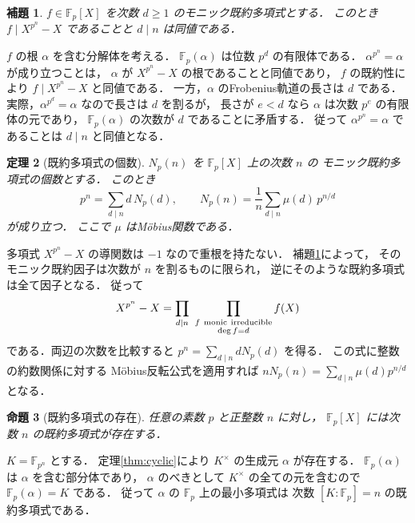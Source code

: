 \documentclass[a5paper,10pt,onecolumn]{jsarticle}
\makeatletter
\theoremstyle{mathnotetheorem}
\newtheorem{theorem}{定理}[section]
\newtheorem{lemma}[theorem]{補題}
\newtheorem{proposition}[theorem]{命題}
\renewcommand{\proofname}{証明}
\renewenvironment{proof}[1][\proofname]{%
  \par\pushQED{\qed}\normalfont\topsep4\p@\@plus2\p@\relax
  \trivlist\item[\hskip\labelsep\bfseries #1]\ignorespaces
}{\popQED\endtrivlist\@endpefalse}
\makeatother
\begin{document}
\begin{lemma}\label{lem:irreducible-divisor}
$f\in\mathbb F_p[X]$ を次数 $d\ge1$ のモニック既約多項式とする．
このとき $f\mid X^{p^n}-X$ であることと $d\mid n$ は同値である．
\end{lemma}
\begin{proof}
$f$ の根 $\alpha$ を含む分解体を考える．
$\mathbb F_p(\alpha)$ は位数 $p^d$ の有限体である．
$\alpha^{p^n}=\alpha$ が成り立つことは，
$\alpha$ が $X^{p^n}-X$ の根であることと同値であり，
$f$ の既約性により $f\mid X^{p^n}-X$ と同値である．
一方，$\alpha$ のFrobenius軌道の長さは $d$ である．
実際，$\alpha^{p^d}=\alpha$ なので長さは $d$ を割るが，
長さが $e<d$ なら $\alpha$ は次数 $p^e$ の有限体の元であり，
$\mathbb F_p(\alpha)$ の次数が $d$ であることに矛盾する．
従って $\alpha^{p^n}=\alpha$ であることは
$d\mid n$ と同値となる．
\end{proof}

\begin{theorem}[既約多項式の個数]\label{thm:irreducible-count}
$N_p(n)$ を $\mathbb F_p[X]$ 上の次数 $n$ の
モニック既約多項式の個数とする．
このとき
\[
 p^n=\sum_{d\mid n}d\,N_p(d),
 \qquad
 N_p(n)=\frac1n\sum_{d\mid n}\mu(d)\,p^{n/d}
\]
が成り立つ．
ここで $\mu$ はM\"obius関数である．
\end{theorem}
\begin{proof}
多項式 $X^{p^n}-X$ の導関数は $-1$ なので重根を持たない．
補題\ref{lem:irreducible-divisor}によって，
そのモニック既約因子は次数が $n$ を割るものに限られ，
逆にそのような既約多項式は全て因子となる．
従って
\[
 X^{p^n}-X=
 \prod_{d\mid n}\ \prod_{\substack{f\ {\rm monic\ irreducible}\\\deg f=d}}f(X)
\]
である．両辺の次数を比較すると
$p^n=\sum_{d\mid n}dN_p(d)$ を得る．
この式に整数の約数関係に対する
M\"obius反転公式を適用すれば
$nN_p(n)=\sum_{d\mid n}\mu(d)p^{n/d}$
となる．
\end{proof}

\begin{proposition}[既約多項式の存在]\label{prop:irreducible-exists}
任意の素数 $p$ と正整数 $n$ に対し，
$\mathbb F_p[X]$ には次数 $n$ の既約多項式が存在する．
\end{proposition}
\begin{proof}
$K=\mathbb F_{p^n}$ とする．
定理\ref{thm:cyclic}により
$K^\times$ の生成元 $\alpha$ が存在する．
$\mathbb F_p(\alpha)$ は $\alpha$ を含む部分体であり，
$\alpha$ のべきとして $K^\times$ の全ての元を含むので
$\mathbb F_p(\alpha)=K$ である．
従って $\alpha$ の $\mathbb F_p$ 上の最小多項式は
次数 $[K:\mathbb F_p]=n$ の既約多項式である．
\end{proof}
\end{document}
